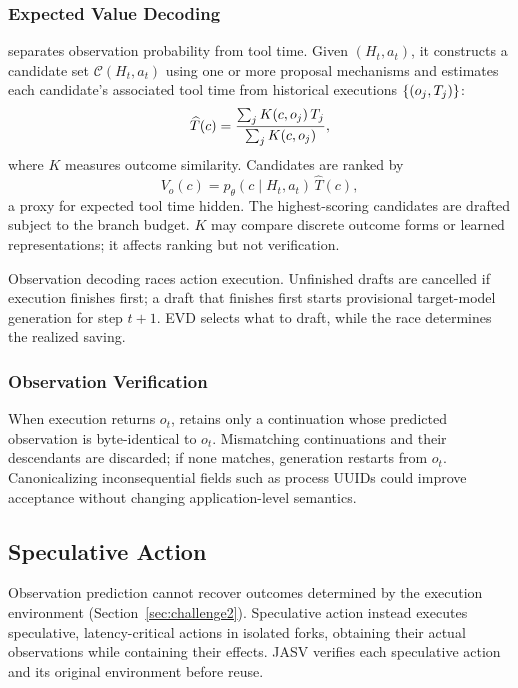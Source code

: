 \subsubsection{Expected Value Decoding}

\evd{} separates observation probability from tool time. Given $(H_t,a_t)$, it constructs
a candidate set $\mathcal C(H_t,a_t)$ using one or more proposal mechanisms and estimates
each candidate's associated tool time from historical executions
$\{(o_j,T_j)\}$:
\begin{equation}
\widehat T(c)
=
\frac{\sum_j K(c,o_j)\,T_j}
     {\sum_j K(c,o_j)},
\end{equation}
where $K$ measures outcome similarity. Candidates are ranked by
\begin{equation}
V_o(c)
=
p_\theta(c\mid H_t,a_t)\,\widehat T(c),
\end{equation}
a proxy for expected tool time hidden. The highest-scoring candidates are drafted subject
to the branch budget. $K$ may compare discrete outcome forms or learned representations;
it affects ranking but not verification.

Observation decoding races action execution. Unfinished drafts are cancelled if execution
finishes first; a draft that finishes first starts provisional target-model generation
for step $t+1$. EVD selects what to draft, while the race determines the realized saving.

\subsubsection{Observation Verification}

When execution returns $o_t$, \sysname{} retains only a continuation whose predicted
observation is byte-identical to $o_t$. Mismatching continuations and their descendants
are discarded; if none matches, generation restarts from $o_t$. Canonicalizing
inconsequential fields such as process UUIDs could improve acceptance without changing
application-level semantics.

\subsection{Speculative Action}
\label{subsec:speculative-action}

Observation prediction cannot recover outcomes determined by the execution environment
(Section~\ref{sec:challenge2}). Speculative action instead executes speculative,
latency-critical actions in isolated forks, obtaining their actual observations while
containing their effects. JASV verifies each speculative action and its original environment
before reuse.


